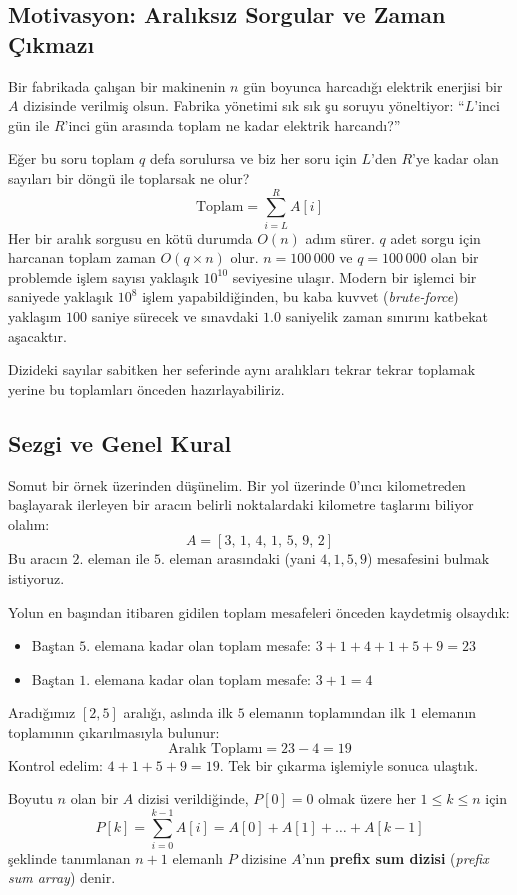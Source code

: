 \subsection{Motivasyon: Aralıksız Sorgular ve Zaman Çıkmazı}
Bir fabrikada çalışan bir makinenin $n$ gün boyunca harcadığı elektrik enerjisi bir $A$ dizisinde verilmiş olsun. Fabrika yönetimi sık sık şu soruyu yöneltiyor: ``$L$'inci gün ile $R$'inci gün arasında toplam ne kadar elektrik harcandı?''

Eğer bu soru toplam $q$ defa sorulursa ve biz her soru için $L$'den $R$'ye kadar olan sayıları bir döngü ile toplarsak ne olur?
\[
\text{Toplam} = \sum_{i=L}^{R} A[i]
\]
Her bir aralık sorgusu en kötü durumda $O(n)$ adım sürer. $q$ adet sorgu için harcanan toplam zaman $O(q \times n)$ olur. $n = 100\,000$ ve $q = 100\,000$ olan bir problemde işlem sayısı yaklaşık $10^{10}$ seviyesine ulaşır. Modern bir işlemci bir saniyede yaklaşık $10^8$ işlem yapabildiğinden, bu kaba kuvvet (\emph{brute-force}) yaklaşım $100$ saniye sürecek ve sınavdaki $1.0$ saniyelik zaman sınırını katbekat aşacaktır.

Dizideki sayılar sabitken her seferinde aynı aralıkları tekrar tekrar toplamak yerine bu toplamları önceden hazırlayabiliriz.

\subsection{Sezgi ve Genel Kural}
Somut bir örnek üzerinden düşünelim. Bir yol üzerinde $0$'ıncı kilometreden başlayarak ilerleyen bir aracın belirli noktalardaki kilometre taşlarını biliyor olalım:
\[
A = [3, \, 1, \, 4, \, 1, \, 5, \, 9, \, 2]
\]
Bu aracın $2$. eleman ile $5$. eleman arasındaki (yani $4, 1, 5, 9$) mesafesini bulmak istiyoruz. 

Yolun en başından itibaren gidilen toplam mesafeleri önceden kaydetmiş olsaydık:
\begin{itemize}
    \item Baştan $5$. elemana kadar olan toplam mesafe: $3 + 1 + 4 + 1 + 5 + 9 = 23$
    \item Baştan $1$. elemana kadar olan toplam mesafe: $3 + 1 = 4$
\end{itemize}
Aradığımız $[2, 5]$ aralığı, aslında ilk $5$ elemanın toplamından ilk $1$ elemanın toplamının çıkarılmasıyla bulunur:
\[
\text{Aralık Toplamı} = 23 - 4 = 19
\]
Kontrol edelim: $4 + 1 + 5 + 9 = 19$. Tek bir çıkarma işlemiyle sonuca ulaştık.

\begin{definition}
Boyutu $n$ olan bir $A$ dizisi verildiğinde, $P[0] = 0$ olmak üzere her $1 \le k \le n$ için
\[
P[k] = \sum_{i=0}^{k-1} A[i] = A[0] + A[1] + \dots + A[k-1]
\]
şeklinde tanımlanan $n+1$ elemanlı $P$ dizisine $A$'nın \textbf{prefix sum dizisi} (\emph{prefix sum array}) denir.
\end{definition}

